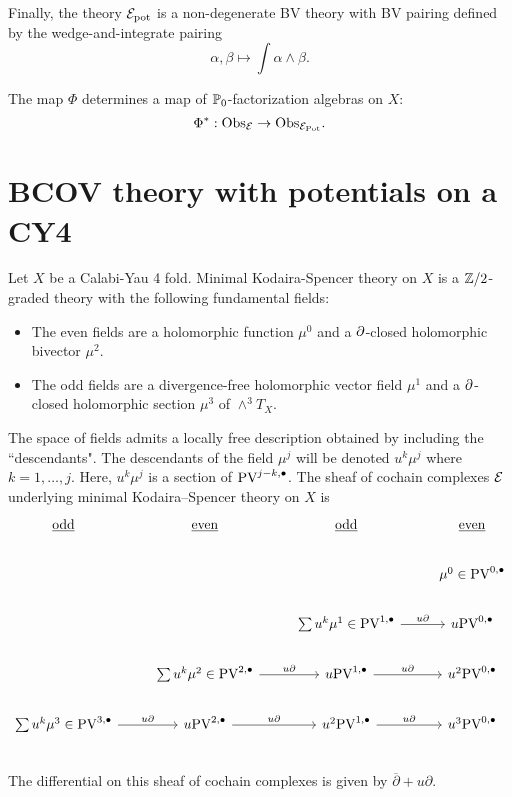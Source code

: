 \documentclass[11pt]{article}
\newcommand\bu{\bullet}
\newcommand\dbar{\overline{\partial}}
\begin{document}
Finally, the theory $\mathcal{E}_{\rm pot}$ is a non-degenerate BV theory with BV pairing defined by the wedge-and-integrate pairing
\[
\alpha, \beta \mapsto \int \alpha \wedge \beta  .
\]

\begin{prop}
The map $\Phi$ determines a map of $\mathbb{P}_0$-factorization algebras on $X$:
\[
\Phi^* : {\rm Obs}_{\mathcal{E}} \to {\rm Obs}_{\mathcal{E}_{\rm Pot}} .
\]
\end{prop}

\section{BCOV theory with potentials on a CY4}
\label{sec:org3d6a090}
Let \(X\) be a Calabi-Yau 4 fold. Minimal Kodaira-Spencer theory on $X$ is a $\mathbb{Z}/2$-graded theory with the following fundamental fields:
\begin{itemize}
\item The even fields are a holomorphic function $\mu^0$ and a $\partial$-closed holomorphic bivector $\mu^2$.
\item The odd fields are a divergence-free holomorphic vector field $\mu^1$ and a $\partial$-closed holomorphic section $\mu^3$ of $\wedge^3 T_X$. 
\end{itemize}


The space of fields admits a locally free description obtained by including the ``descendants". 
The descendants of the field $\mu^j$ will be denoted $u^k \mu^j$ where $k = 1,\ldots, j$.
Here, $u^k \mu^j$ is a section of $\PV^{j - k, \bu}$. 
The sheaf of cochain complexes $\mathcal{E}$ underlying minimal Kodaira--Spencer theory on $X$ is 
\[
\begin{tikzcd}
\ul{\rm odd} & \ul{\rm even} & \ul{\rm odd} & \ul{\rm even} \\
& & & \mu^0 \in \PV^{0,\bu} \\
& & \sum u^k \mu^1 \in \PV^{1,\bu} \ar[r, "u \partial"] & u \PV^{0,\bu} \\
& \sum u^k \mu^2 \in  \PV^{2,\bu} \ar[r,"u \del"] & u \PV^{1,\bu} \ar[r, "u \partial"] & u^2 \PV^{0,\bu} \\ 
\sum u^k \mu^3 \in \PV^{3,\bu} \ar[r, "u \del"]& u \PV^{2,\bu} \ar[r,"u \del"] & u^2 \PV^{1,\bu} \ar[r, "u \partial"] & u^3\PV^{0,\bu} \\ 
\end{tikzcd}
\]
The differential on this sheaf of cochain complexes is given by $\dbar + u \partial$. 
\end{document}

